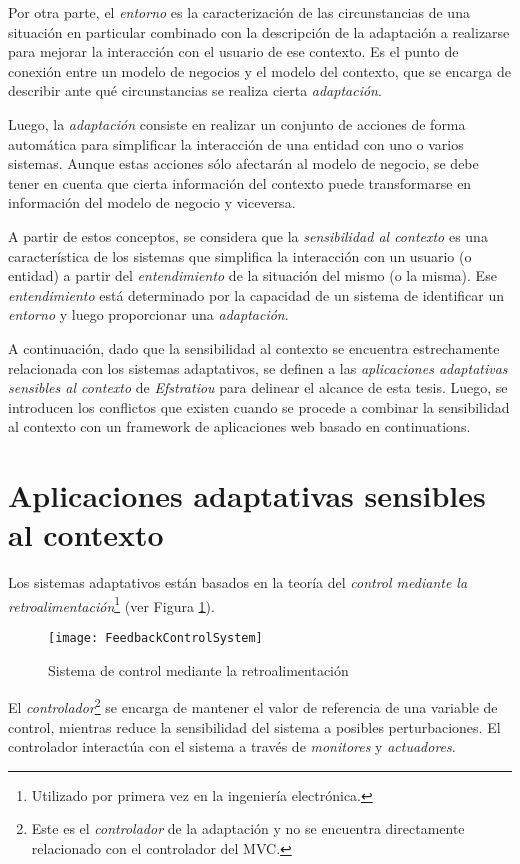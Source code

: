 Por otra parte, el \emph{entorno} es la caracterización de las circunstancias de una situación en particular combinado con la descripción de la adaptación a realizarse para mejorar la interacción con el usuario de ese contexto. Es el punto de conexión entre un modelo de negocios y el modelo del contexto, que se encarga de describir ante qué circunstancias se realiza cierta \emph{adaptación}.

Luego, la \emph{adaptación} consiste en realizar un conjunto de acciones de forma automática para simplificar la interacción de una entidad con uno o varios sistemas. Aunque estas acciones sólo afectarán al modelo de negocio, se debe tener en cuenta que cierta información del contexto puede transformarse en información del modelo de negocio y viceversa.

A partir de estos conceptos, se considera que la \emph{sensibilidad al contexto} es una característica de los sistemas que simplifica la interacción con un usuario (o entidad) a partir del \emph{entendimiento} de la situación del mismo (o la misma). Ese \emph{entendimiento} está determinado por la capacidad de un sistema de identificar un \emph{entorno} y luego proporcionar una \emph{adaptación}.

A continuación, dado que la sensibilidad al contexto se encuentra estrechamente relacionada con los sistemas adaptativos, se definen a las \emph{aplicaciones adaptativas sensibles al contexto} de \emph{Efstratiou}\cite{Efstratiou04} para delinear el alcance de esta tesis. Luego, se introducen los conflictos que existen cuando se procede a combinar la sensibilidad al contexto con un framework de aplicaciones web basado en continuations.


\section{Aplicaciones adaptativas sensibles al contexto}

Los sistemas adaptativos\cite{Cen97,Kokar99,Meng01} están basados en la teoría del \emph{control mediante la retroalimentación}\footnote{Utilizado por primera vez en la ingeniería electrónica.} (ver Figura \ref{FeedbackControlSystem}).

\begin{figure}[ht!]
\centering
\texttt{[image: FeedbackControlSystem]}
\caption{Sistema de control mediante la retroalimentación}
\label{FeedbackControlSystem}
\end{figure}

El \emph{controlador}\footnote{Este es el \emph{controlador} de la adaptación y no se encuentra directamente relacionado con el controlador del MVC.} se encarga de mantener el valor de referencia de una variable de control, mientras reduce la sensibilidad del sistema a posibles perturbaciones. El controlador interactúa con el sistema a través de \emph{monitores} y \emph{actuadores}.

